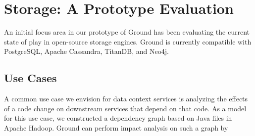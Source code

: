 \documentclass{sig-alternate}
\begin{document}

\smallitembot


\section{Storage: A Prototype Evaluation}
\label{sec:storage}

An initial focus area in our prototype of Ground has been evaluating the current state of play in open-source storage engines. 
Ground is currently compatible with PostgreSQL, Apache Cassandra, TitanDB, and Neo4j. 

\subsection{Use Cases}
 A common use case we envision for data context services is analyzing the effects of a code change on downstream services that depend on that code.
As a model for this use case, we constructed a dependency graph based on Java files in Apache Hadoop.
Ground can perform impact analysis on such a graph by 
\smallitem{}

\end{document}
